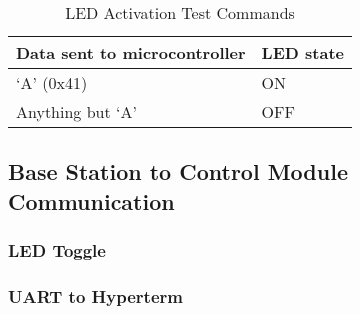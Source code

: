 \begin{table}[H]
\centering
\begin{tabular}{|l|l|}
\hline
{\color{black} Data sent to microcontroller} &
{\color{black} LED state}\\\hline
{\color{black} {}`A{}' (0x41)} &
{\color{black} ON}\\\hline
{\color{black} Anything but {}`A{}'} &
{\color{black} OFF}\\\hline
\end{tabular}
\caption{LED Activation Test Commands}
\label{tab:test-led-act}
\end{table}

\subsection{Base Station to Control Module Communication}

\subsubsection{LED Toggle}

\subsubsection{UART to Hyperterm}

